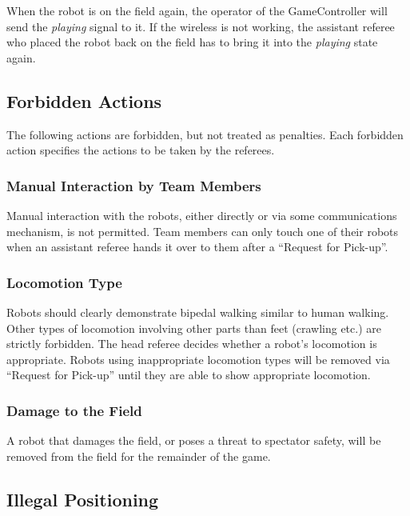 \documentclass[12pt]{article}
\begin{document}
When the robot is on the field again, the operator of the GameController will send the \emph{playing} signal to it. If the wireless is not working, the assistant referee who placed the robot back on the field has to bring it into the \emph{playing} state again.


\subsection{Forbidden Actions}

The following actions are forbidden, but not treated as penalties.
Each forbidden action specifies the actions to be taken by the referees.

\subsubsection{Manual Interaction by Team Members}

Manual interaction with the robots, either directly or via some communications mechanism, is not permitted. 
Team members can only touch one of their robots when an assistant referee hands it over to them after a ``Request for Pick-up''.

\subsubsection{Locomotion Type}
\label{sec:locomotion_type}

Robots should clearly demonstrate bipedal walking similar to human walking. Other types of locomotion involving other parts than feet (crawling etc.) are strictly forbidden.
The head referee decides whether a robot's locomotion is appropriate. Robots using inappropriate locomotion types will be removed via ``Request for Pick-up'' until they are able to show appropriate locomotion.

\subsubsection{Damage to the Field}
\label{sec:damage}

A robot that damages the field, or poses a threat to spectator safety, will be removed from the field for the remainder of the game. 

\subsection{Illegal Positioning}
\label{sec:illegal_positioning}
\end{document}
